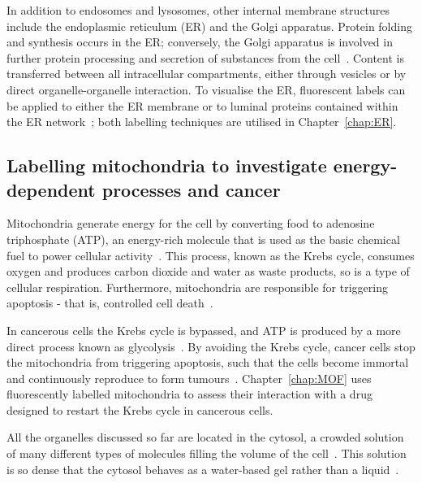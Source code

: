 In addition to endosomes and lysosomes, other internal membrane structures include the endoplasmic reticulum (ER) and the Golgi apparatus. 
Protein folding and synthesis occurs in the ER; conversely, the Golgi apparatus is involved in further protein processing and secretion of substances from the cell~\cite{dyson1978cell}. 
Content is transferred between all intracellular compartments, either through vesicles or by direct organelle-organelle interaction. 
To visualise the ER, fluorescent labels can be applied to either the ER membrane or to luminal proteins contained within the ER network~\cite{costantini2013probing}; both labelling techniques are utilised in Chapter~\ref{chap:ER}.  

\subsection{Labelling mitochondria to investigate energy-dependent processes and cancer}
Mitochondria generate energy for the cell by converting food to adenosine triphosphate (ATP), an energy-rich molecule that is used as the basic chemical fuel to power cellular activity~\cite{alberts2013essential}. 
This process, known as the Krebs cycle, consumes oxygen and produces carbon dioxide and water as waste products, so is a type of cellular respiration. 
Furthermore, mitochondria are responsible for triggering apoptosis - that is, controlled cell death~\cite{murray1993cell}. 

In cancerous cells the Krebs cycle is bypassed, and ATP is produced by a more direct process known as glycolysis~\cite{warburg1930uber}. 
By avoiding the Krebs cycle, cancer cells stop the mitochondria from triggering apoptosis, such that the cells become immortal and continuously
 reproduce to form tumours~\cite{murray1993cell}. 
Chapter~\ref{chap:MOF} uses fluorescently labelled  mitochondria to assess their interaction with a drug designed to restart the Krebs cycle in cancerous cells. 

All the organelles discussed so far are located in the cytosol, a crowded solution of many different types of molecules filling the volume of the cell~\cite{goodsell1991inside}. 
This solution is so dense that the cytosol behaves as a water-based gel rather than a liquid~\cite{alberts2013essential}. 

